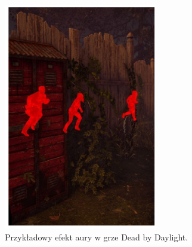 \begin{figure}[h]
\centering
\includegraphics[width=0.6\textwidth]{images/dbd}
\caption{Przykładowy efekt aury w grze Dead by Daylight.}
\end{figure}
